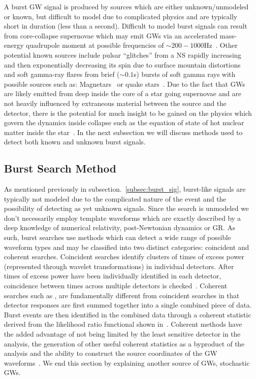 A burst \ac{GW} signal is produced by sources which are either 
unknown/unmodeled or known, but difficult to model due to 
complicated physics and are typically short in duration (less 
than a second).  
Difficult to model burst signals can result from core-collapse supernovae 
which may emit \ac{GW}s via an accelerated mass-energy quadrupole 
moment at possible frequencies of $\sim 200 - 1000$Hz~\cite{Ott_2009}. 
Other potential known sources include pulsar ``glitches'' 
from a \ac{NS} rapidly increasing and then exponentially decreasing 
its spin due to surface mountain 
distortions~\cite{2020MNRAS.498.3138Y} and soft 
gamma-ray flares 
from brief ($\sim 0.1$s) bursts of soft gamma rays with possible 
sources such as: Magnetars~\cite{1992ApJ...392L...9D} or 
quake stars~\cite{Xu_2003}. 
Due to the fact that \ac{GW}s are likely emitted from deep 
inside the core of a star going supernovae and are not heavily influenced by 
extraneous material between the source and the detector, there is the 
potential for much insight to be gained on the physics which govern 
the dynamics inside collapse such as the equation of state of 
hot nuclear matter inside the star~\cite{Sathyaprakash2009}. In the 
next subsection we 
will discuss methods used to detect both known and unknown burst signals.

\subsection{Burst Search Method}

As mentioned previously in subsection.~\ref{subsec:burst_sig}, 
burst-like signals are typically not modeled due to the complicated 
nature of the event and the possibility of detecting as yet unknown signals.
Since the search is unmodeled we don't necessarily employ  
template waveforms which are exactly described by a deep knowledge of 
numerical relativity, post-Newtonian dynamics or \ac{GR}. As such, 
burst searches use methods which can detect a wide 
range of possible waveform types and may be classified into 
two distinct categories: coincident and coherent searches. Coincident searches 
identify clusters of times of excess power (represented through 
wavelet transformations) in individual detectors. After times 
of excess power have been individually identified in each detector, 
coincidence between 
times across multiple detectors is checked~\cite{2004CQGra..21S1685K}. 
Coherent searches such as 
\cite{2015CQGra..32m5012C,2008CQGra..25k4029K}, are fundamentally 
different from coincident searches in that detector responses 
are first summed together into a single combined piece of data. Burst 
events are then identified in the combined data through a coherent 
statistic derived from the likelihood ratio functional 
shown in~\cite{PhysRevD.72.122002}. 
Coherent methods have the added advantage of not being limited by the 
least sensitive detector in the analysis, the generation of other 
useful coherent 
statistics as a byproduct of the analysis and the ability to 
construct the source coordinates of 
the \ac{GW} waveforms~\cite{2008CQGra..25k4029K}. We end this 
section by explaining another source of \ac{GW}s, stochastic 
\ac{GW}s.

